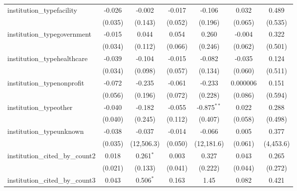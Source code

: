\begin{tabular}{lcccccc}
   institution\_typefacility             & -0.026         & -0.002        & -0.017        & -0.106        & 0.032         & 0.489\\   
                                         & (0.035)        & (0.143)       & (0.052)       & (0.196)       & (0.065)       & (0.535)\\   
   institution\_typegovernment           & -0.015         & 0.044         & 0.054         & 0.260         & -0.004        & 0.322\\   
                                         & (0.034)        & (0.112)       & (0.066)       & (0.246)       & (0.062)       & (0.501)\\   
   institution\_typehealthcare           & -0.039         & -0.104        & -0.015        & -0.082        & -0.035        & 0.124\\   
                                         & (0.034)        & (0.098)       & (0.057)       & (0.134)       & (0.060)       & (0.511)\\   
   institution\_typenonprofit            & -0.072         & -0.235        & -0.061        & -0.233        & 0.000006      & 0.151\\   
                                         & (0.056)        & (0.196)       & (0.072)       & (0.228)       & (0.086)       & (0.594)\\   
   institution\_typeother                & -0.040         & -0.182        & -0.055        & -0.875$^{**}$ & 0.022         & 0.288\\   
                                         & (0.040)        & (0.245)       & (0.112)       & (0.407)       & (0.058)       & (0.498)\\   
   institution\_typeunknown              & -0.038         & -0.037        & -0.014        & -0.066        & 0.005         & 0.377\\   
                                         & (0.035)        & (12,506.3)    & (0.050)       & (12,181.6)    & (0.061)       & (4,453.6)\\   
   institution\_cited\_by\_count2        & 0.018          & 0.261$^{*}$   & 0.003         & 0.327         & 0.043         & 0.265\\   
                                         & (0.021)        & (0.133)       & (0.041)       & (0.222)       & (0.044)       & (0.272)\\   
   institution\_cited\_by\_count3        & 0.043          & 0.506$^{*}$   & 0.163         & 1.45          & 0.082         & 0.421\\   

\end{tabular}
